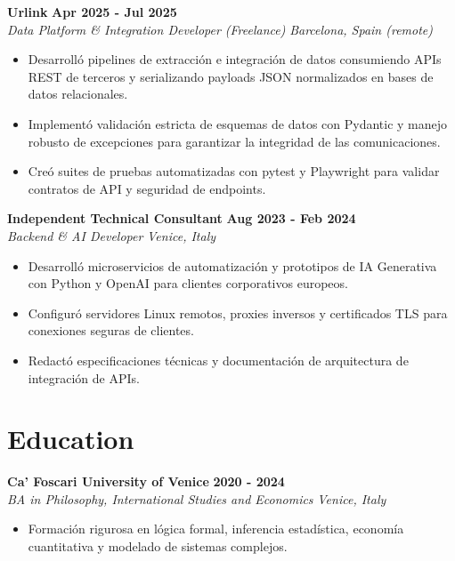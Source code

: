 \documentclass[10pt,a4paper]{article}
\newcommand{\role}[4]{%
  \textbf{#1} \hfill \textbf{#2}\\[1pt]%
  \textit{#3} \hfill \textit{#4}\\[2pt]%
}
\begin{document}
\role{Urlink}{Apr 2025 - Jul 2025}{Data Platform \& Integration Developer (Freelance)}{Barcelona, Spain (remote)}
\begin{itemize}
  \item Desarrolló pipelines de extracción e integración de datos consumiendo APIs REST de terceros y serializando payloads JSON normalizados en bases de datos relacionales.
  \item Implementó validación estricta de esquemas de datos con Pydantic y manejo robusto de excepciones para garantizar la integridad de las comunicaciones.
  \item Creó suites de pruebas automatizadas con pytest y Playwright para validar contratos de API y seguridad de endpoints.
\end{itemize}

\role{Independent Technical Consultant}{Aug 2023 - Feb 2024}{Backend \& AI Developer}{Venice, Italy}
\begin{itemize}
  \item Desarrolló microservicios de automatización y prototipos de IA Generativa con Python y OpenAI para clientes corporativos europeos.
  \item Configuró servidores Linux remotos, proxies inversos y certificados TLS para conexiones seguras de clientes.
  \item Redactó especificaciones técnicas y documentación de arquitectura de integración de APIs.
\end{itemize}

\section{Education}
\role{Ca' Foscari University of Venice}{2020 - 2024}{BA in Philosophy, International Studies and Economics}{Venice, Italy}
\begin{itemize}
  \item Formación rigurosa en lógica formal, inferencia estadística, economía cuantitativa y modelado de sistemas complejos.
\end{itemize}
\end{document}
